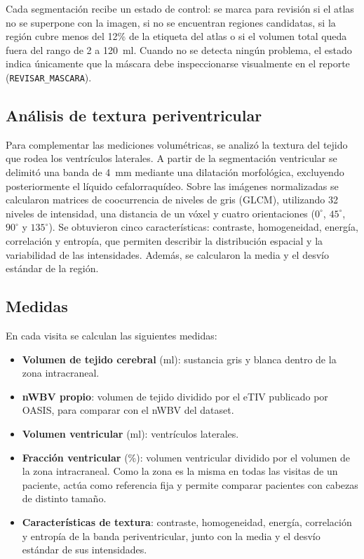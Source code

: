 \documentclass[10pt]{article}
\begin{document}
Cada segmentación recibe un estado de control: se marca para revisión si el atlas no se superpone con la imagen, si no se encuentran regiones candidatas, si la región cubre menos del 12\% de la etiqueta del atlas o si el volumen total queda fuera del rango de 2 a 120~ml. Cuando no se detecta ningún problema, el estado indica únicamente que la máscara debe inspeccionarse visualmente en el reporte (\texttt{REVISAR\_MASCARA}).

\subsection{Análisis de textura periventricular}

Para complementar las mediciones volumétricas, se analizó la textura del tejido que rodea los ventrículos laterales. A partir de la segmentación ventricular se delimitó una banda de 4~mm mediante una dilatación morfológica, excluyendo posteriormente el líquido cefalorraquídeo. Sobre las imágenes normalizadas se calcularon matrices de coocurrencia de niveles de gris (GLCM), utilizando 32 niveles de intensidad, una distancia de un vóxel y cuatro orientaciones ($0^\circ$, $45^\circ$, $90^\circ$ y $135^\circ$). Se obtuvieron cinco características: contraste, homogeneidad, energía, correlación y entropía, que permiten describir la distribución espacial y la variabilidad de las intensidades. Además, se calcularon la media y el desvío estándar de la región.

\subsection{Medidas}
 
En cada visita se calculan las siguientes medidas:
\begin{itemize}
    \item \textbf{Volumen de tejido cerebral} (ml): sustancia gris y blanca dentro de la zona intracraneal.
    \item \textbf{nWBV propio}: volumen de tejido dividido por el eTIV publicado por OASIS, para comparar con el nWBV del dataset.
    \item \textbf{Volumen ventricular} (ml): ventrículos laterales.
    \item \textbf{Fracción ventricular} (\%): volumen ventricular dividido por el volumen de la zona intracraneal. Como la zona es la misma en todas las visitas de un paciente, actúa como referencia fija y permite comparar pacientes con cabezas de distinto tamaño.
    \item \textbf{Características de textura}: contraste, homogeneidad, energía, correlación y entropía de la banda periventricular, junto con la media y el desvío estándar de sus intensidades.
\end{itemize}
\end{document}
